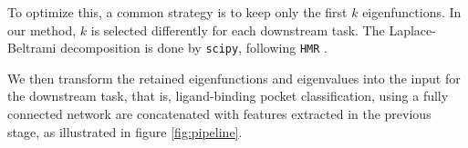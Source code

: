 To optimize this, a common strategy is to keep only the first $k$ eigenfunctions.
In our method, $k$ is selected differently for each downstream task.
The Laplace-Beltrami decomposition is done by \texttt{scipy}, following \texttt{HMR} \cite{HMR}.

We then transform the retained eigenfunctions and eigenvalues into the input for the downstream task, that is, ligand-binding pocket classification, using a fully connected network are concatenated with features extracted in the previous stage, as illustrated in figure \ref{fig:pipeline}.